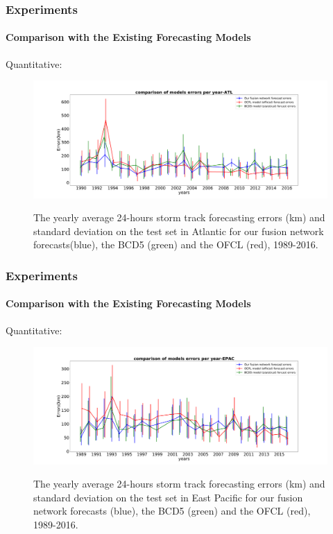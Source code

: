 \documentclass{beamer}
\begin{document}
\begin{frame}
\frametitle{Experiments}
\framesubtitle{Comparison with the Existing Forecasting Models}
Quantitative: 
\begin{figure}
	\includegraphics[width=1.0\linewidth]{figs/ATL_comparison_of_models_errors_per_year.pdf}\\
	\caption{The yearly average 24-hours storm track forecasting errors (km) and standard deviation on the test set in Atlantic for our fusion network forecasts(blue), the BCD5 (green) and the OFCL (red), 1989-2016.}
\end{figure}
\end{frame}

\begin{frame}
\frametitle{Experiments}
\framesubtitle{Comparison with the Existing Forecasting Models}
Quantitative: 
\begin{figure}
	\includegraphics[width=1.0\linewidth]{figs/EPAC_comparison_of_models_errors_per_year.pdf}\\
	\caption{The yearly average 24-hours storm track forecasting errors (km) and standard deviation on the test set in East Pacific for our fusion network forecasts (blue), the BCD5 (green) and the OFCL (red), 1989-2016.}
\end{figure}
\end{frame}
\end{document}
